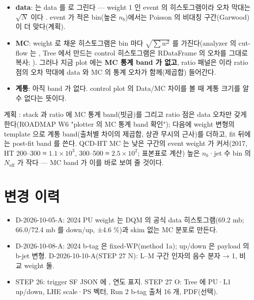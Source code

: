 \begin{itemize}
\item \textbf{data}:  는 data 를  로 그린다 — weight 1 인 event 의 히스토그램이라 오차 막대는 $\sqrt{N}$ 이다
  . event 가 적은 bin(높은 $n_b$)에서는 Poisson 의 비대칭 구간(Garwood)이 더 맞다(계획).
\item \textbf{MC}: weight 로 채운 히스토그램은 bin 마다 $\sqrt{\sum w^2}$ 를 가진다(analyzer 의 cut-flow 는 , Tree 에서 만드는 control
  히스토그램은 RDataFrame 의 오차를 그대로 복사; ). 그러나 지금 plot 에는 \textbf{MC 통계 band 가 없고}, ratio 패널은
   이라 ratio 점의 오차 막대에 data 와 MC 의 통계 오차가 함께(제곱합) 들어간다.
\item \textbf{계통}: 아직 band 가 없다. control plot 의 Data/MC 차이를 볼 때 계통 크기를 알 수 없다는 뜻이다.
\end{itemize}
계획 \tagplan: stack 과 ratio 에 MC 통계 band(빗금)를 그리고 ratio 점은 data 오차만 갖게 한다(ROADMAP W6 "plotter 의 MC 통계 band 확인"); 다음에
weight 변형의 template 으로 계통 band(출처별 차이의 제곱합, 상관 무시의 근사)를 더하고, fit 뒤에는 post-fit band 를 쓴다.
QCD-HT MC 는 낮은 \HT 구간의 event weight 가 커서(2017, HT 200--300 ≈ $1.1\times10^{3}$, 300--500 ≈ $2.5\times10^{2}$; 표본표로 계산) 높은 $n_b$·jet 수
bin 의 $N_{\mathrm{eff}}$ 가 작다 — MC band 가 이를 바로 보여 줄 것이다.

\section{변경 이력}\label{sec:syst-history}

\begin{itemize}
\item D-2026-10-05-A: 2024 PU weight 는 DQM 의 공식 data 히스토그램(69.2 mb; 66.0/72.4 mb 를 down/up, ±4.6 \%)과 skim 없는 MC 분포로 만든다.
\item D-2026-10-08-A: 2024 b-tag 은 fixed-WP(method 1a); up/down 은 payload 의 b-jet 변형. D-2026-10-10-A(STEP 27 N): L--M 구간 인자의 음수 분자 → 1,
  비교 weight 둘.
\item STEP 26: trigger SF JSON 에 , 연도 표지. STEP 27 O: Tree 에 PU·L1 up/down, LHE scale·PS 벡터, Run 2 b-tag 출처 16 개, PDF(선택).
\end{itemize}

